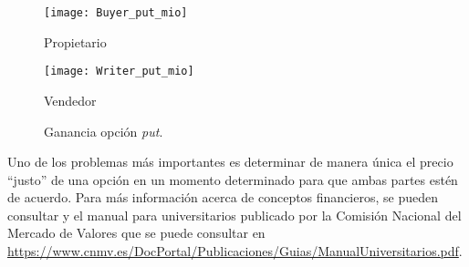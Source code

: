 \begin{figure}[h!]
	
	\begin{minipage}{0.5\textwidth}
		\centering
		\texttt{[image: Buyer\_put\_mio]} 
		\caption*{Propietario}
	\end{minipage}
	\begin{minipage}{0.5\textwidth}
		\texttt{[image: Writer\_put\_mio]}
		\caption*{Vendedor}
		
	\end{minipage}
	\caption{Ganancia opción \textit{put}.}
	\label{graphPut}
\end{figure} 
Uno de los problemas más importantes es determinar de manera única el precio ``justo'' de una opción en un momento determinado para que ambas partes estén de acuerdo. Para más información acerca de conceptos financieros, se pueden consultar \cite{elliot1999mathematics} y el manual para universitarios publicado por la Comisión Nacional del Mercado de Valores que se puede consultar en \url{https://www.cnmv.es/DocPortal/Publicaciones/Guias/ManualUniversitarios.pdf}.\\
